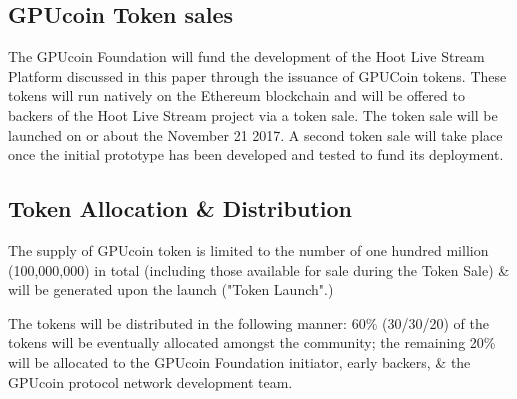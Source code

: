 \documentclass{article}
\begin{document}
\subsection{GPUcoin Token sales} %
\label{sub:hoot_token_sales}
The GPUcoin Foundation will fund the development of the Hoot Live Stream Platform discussed in this paper through the issuance of GPUCoin tokens. These tokens will run natively on the Ethereum blockchain and will be offered to backers of the Hoot Live Stream project via a token sale. The token sale will be launched on or about the November 21 2017. A second token sale will take place once the initial prototype has been developed and tested to fund its deployment. 

\subsection{Token Allocation \& Distribution} %
\label{sub:token_allocation_and_distribution}
 The supply of GPUcoin token is limited to the number of one hundred million (100,000,000) in total (including those available for sale during the Token Sale) \& will be generated upon the launch ("Token Launch".)

 The tokens will be distributed in the following manner:
60\% (30/30/20) of the tokens will be eventually allocated amongst the community; the remaining 20\% will be allocated to the GPUcoin Foundation initiator, early backers, \& the GPUcoin protocol network development team.
\end{document}
